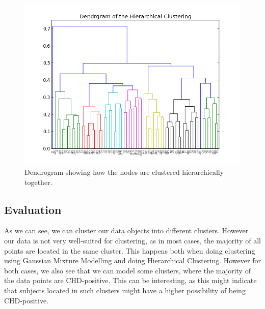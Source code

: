 \begin{figure}[H]
\includegraphics[scale=0.5]{pictures/dendrogram.png}
\caption{\footnotesize Dendrogram showing how the nodes are clustered hierarchically together.}
\label{dendrogram}
\end{figure}


\subsection{Evaluation}

As we can see, we can cluster our data objects into different clusters. However our data is not very well-suited for clustering, as in most cases, the majority of all points are located in the same cluster. This happens both when doing clustering using Gaussian Mixture Modelling and doing Hierarchical Clustering. However for both cases, we also see that we can model some clusters, where the majority of the data points are CHD-positive. This can be interesting, as this might indicate that subjects located in such clusters might have a higher possibility of being CHD-positive.
